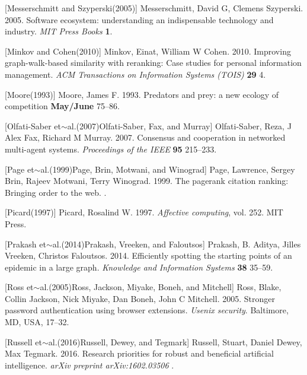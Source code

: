 \documentclass{article} %
\begin{document}
\noindent 

[Messerschmitt and Szyperski(2005)]  Messerschmitt, David G, Clemens Szyperski. 2005.    Software ecosystem: understanding an indispensable technology and industry.    \textit{ MIT Press Books} \textbf{ 1}.

\noindent 

[Minkov and Cohen(2010)]  Minkov, Einat, William W Cohen. 2010.    Improving graph-walk-based similarity with reranking: Case studies for personal information management.    \textit{ ACM Transactions on Information Systems (TOIS)} \textbf{ 29} 4.

\noindent 

[Moore(1993)]  Moore, James F. 1993.    Predators and prey: a new ecology of competition \textbf{ May/June} 75--86.

\noindent 

[Olfati-Saber et$\sim$al.(2007)Olfati-Saber, Fax, and Murray]  Olfati-Saber, Reza, J Alex Fax, Richard M Murray. 2007.    Consensus and cooperation in networked multi-agent systems.    \textit{ Proceedings of the IEEE} \textbf{ 95} 215--233.

\noindent 

[Page et$\sim$al.(1999)Page, Brin, Motwani, and Winograd]  Page, Lawrence, Sergey Brin, Rajeev Motwani, Terry Winograd. 1999.    The pagerank citation ranking: Bringing order to the web. .

\noindent 

[Picard(1997)]  Picard, Rosalind W. 1997.    \textit{ Affective computing}, vol. 252.    MIT Press.

\noindent 

[Prakash et$\sim$al.(2014)Prakash, Vreeken, and Faloutsos]  Prakash, B. Aditya, Jilles Vreeken, Christos Faloutsos. 2014.    Efficiently spotting the starting points of an epidemic in a large graph.    \textit{ Knowledge and Information Systems} \textbf{ 38} 35--59.

\noindent 

[Ross et$\sim$al.(2005)Ross, Jackson, Miyake, Boneh, and Mitchell]  Ross, Blake, Collin Jackson, Nick Miyake, Dan Boneh, John C Mitchell. 2005.    Stronger password authentication using browser extensions.    \textit{ Usenix security}. Baltimore, MD, USA, 17--32.

\noindent 

[Russell et$\sim$al.(2016)Russell, Dewey, and Tegmark]  Russell, Stuart, Daniel Dewey, Max Tegmark. 2016.    Research priorities for robust and beneficial artificial intelligence.    \textit{ arXiv preprint arXiv:1602.03506} .
\end{document}
